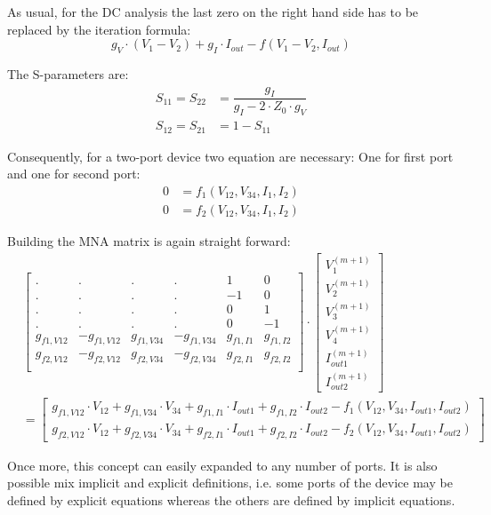 As usual, for the DC analysis the last zero on the right hand side has
to be replaced by the iteration formula:
\begin{equation}
g_V\cdot (V_1 - V_2) + g_I\cdot I_{out} - f(V_1-V_2, I_{out})
\end{equation}

The S-parameters are:
\begin{align}
S_{11} = S_{22} &= \dfrac{g_I}{g_I - 2\cdot Z_0\cdot g_V}\\
S_{12} = S_{21} &= 1 - S_{11}
\end{align}

Consequently, for a two-port device two equation are necessary: One for
first port and one for second port:
\begin{align}
0 &= f_1(V_{12}, V_{34}, I_1, I_2)\\
0 &= f_2(V_{12}, V_{34}, I_1, I_2)
\end{align}

Building the MNA matrix is again straight forward:
\begin{equation}
\begin{split}
&\begin{bmatrix}
 . & . & . & . &  1 &  0\\
 . & . & . & . & -1 &  0\\
 . & . & . & . &  0 &  1\\
 . & . & . & . &  0 & -1\\
 g_{f1,V12} & -g_{f1,V12} &  g_{f1,V34} & -g_{f1,V34} & g_{f1,I1} & g_{f1,I2}\\
 g_{f2,V12} & -g_{f2,V12} &  g_{f2,V34} & -g_{f2,V34} & g_{f2,I1} & g_{f2,I2}\\
\end{bmatrix}
\cdot
\begin{bmatrix}
V_{1}^{(m+1)}\\
V_{2}^{(m+1)}\\
V_{3}^{(m+1)}\\
V_{4}^{(m+1)}\\
I_{out1}^{(m+1)}\\
I_{out2}^{(m+1)}
\end{bmatrix} \\
&=
\begin{bmatrix}
g_{f1,V12}\cdot V_{12} + g_{f1,V34}\cdot V_{34} + g_{f1,I1}\cdot I_{out1} + g_{f1,I2}\cdot I_{out2} - f_1(V_{12}, V_{34}, I_{out1}, I_{out2})\\
g_{f2,V12}\cdot V_{12} + g_{f2,V34}\cdot V_{34} + g_{f2,I1}\cdot I_{out1} + g_{f2,I2}\cdot I_{out2} - f_2(V_{12}, V_{34}, I_{out1}, I_{out2})
\end{bmatrix}
\end{split}
\end{equation}

Once more, this concept can easily expanded to any number of ports.
It is also possible mix implicit and explicit definitions, i.e. some
ports of the device may be defined by explicit equations whereas the
others are defined by implicit equations.